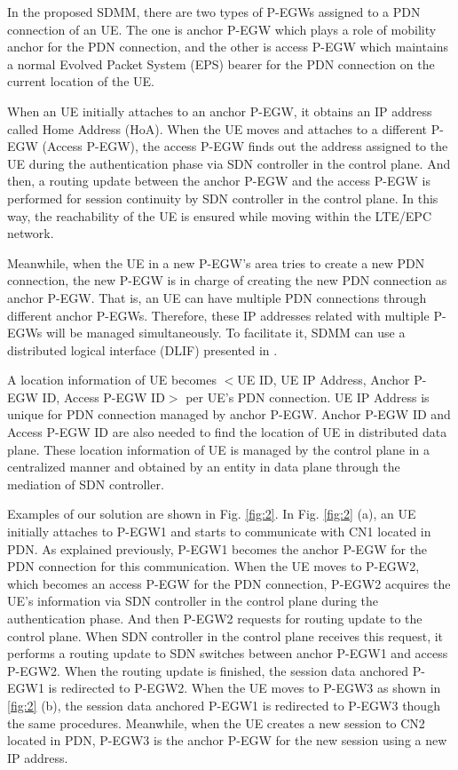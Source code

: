 \documentclass[runningheads,a4paper]{llncs}
\begin{document}
In the proposed SDMM, there are two types of P-EGWs assigned to a PDN connection of an UE. The one is anchor P-EGW which plays a role of mobility anchor for the PDN connection, and the other is access P-EGW which maintains a normal Evolved Packet System (EPS) bearer for the PDN connection on the current location of the UE. 

When an UE initially attaches to an anchor P-EGW, it obtains an IP address called Home Address (HoA). When the UE moves and attaches to a different P-EGW (Access P-EGW), the access P-EGW finds out the address assigned to the UE during the authentication phase via SDN controller in the control plane. And then, a routing update between the anchor P-EGW and the access P-EGW is performed for session continuity by SDN controller in the control plane. In this way, the reachability of the UE is ensured while moving within the LTE/EPC network.

Meanwhile, when the UE in a new P-EGW's area tries to create a new PDN connection, the new P-EGW is in charge of creating the new PDN connection as anchor P-EGW. That is, an UE can have multiple PDN connections through different anchor P-EGWs. Therefore, these IP addresses related with multiple P-EGWs will be managed simultaneously. To facilitate it, SDMM can use a distributed logical interface (DLIF) presented in \cite{ref10}.

A location information of UE becomes $<$UE ID, UE IP Address, Anchor P-EGW ID, Access P-EGW ID$>$ per UE's PDN connection. UE IP Address is unique for PDN connection managed by anchor P-EGW. Anchor P-EGW ID and Access P-EGW ID are also needed to find the location of UE in distributed data plane. These location information of UE is managed by the control plane in a centralized manner and obtained by an entity in data plane through the mediation of SDN controller.

Examples of our solution are shown in Fig. \ref{fig:2}. In Fig. \ref{fig:2} (a), an UE initially attaches to P-EGW1 and starts to communicate with CN1 located in PDN. As explained previously, P-EGW1 becomes the anchor P-EGW for the PDN connection for this communication. When the UE moves to P-EGW2, which becomes an access P-EGW for the PDN connection, P-EGW2 acquires the UE's information via SDN controller in the control plane during the authentication phase. And then P-EGW2 requests for routing update to the control plane. When SDN controller in the control plane receives this request, it performs a routing update to SDN switches between anchor P-EGW1 and access P-EGW2. When the routing update is finished, the session data anchored P-EGW1 is redirected to P-EGW2. When the UE moves to P-EGW3 as shown in \ref{fig:2} (b), the session data anchored P-EGW1 is redirected to P-EGW3 though the same procedures. Meanwhile, when the UE creates a new session to CN2 located in PDN, P-EGW3 is the anchor P-EGW for the new session using a new IP address.
\end{document}
